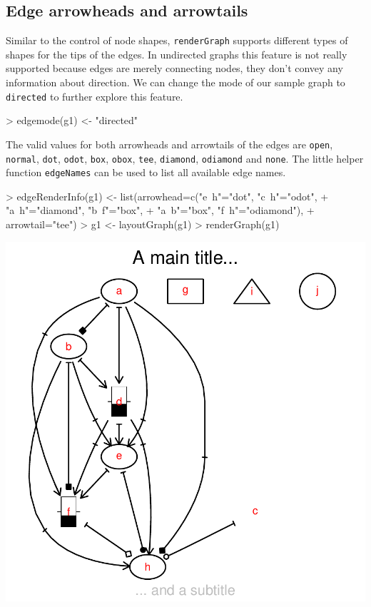 \documentclass{article}
\newcommand{\Rfunction}[1]{{\texttt{#1}}}
\newcommand{\Robject}[1]{{\texttt{#1}}}
\begin{document}
\subsection{Edge arrowheads and arrowtails}

Similar to the control of node shapes, \Rfunction{renderGraph}
supports different types of shapes for the tips of the edges. In
undirected graphs this feature is not really supported because edges
are merely connecting nodes, they don't convey any information about
direction. We can change the mode of our sample graph to
\Robject{directed} to further explore this feature.
\begin{Schunk}
\begin{Sinput}
> edgemode(g1) <- "directed"
\end{Sinput}
\end{Schunk}

The valid values for both arrowheads and arrowtails of the edges are
\Robject{open}, \Robject{normal}, \Robject{dot}, \Robject{odot},
\Robject{box}, \Robject{obox}, \Robject{tee}, \Robject{diamond},
\Robject{odiamond} and \Robject{none}. The little helper function
\Rfunction{edgeNames} can be used to list all available edge names.
\begin{Schunk}
\begin{Sinput}
> edgeRenderInfo(g1) <- list(arrowhead=c("e~h"="dot", "c~h"="odot",
+                                        "a~h"="diamond", "b~f"="box",
+                                        "a~b"="box", "f~h"="odiamond"),
+                            arrowtail="tee")
> g1 <- layoutGraph(g1)
> renderGraph(g1)
\end{Sinput}
\end{Schunk}
\includegraphics{newRgraphvizInterface-arrowheads}
\end{document}
